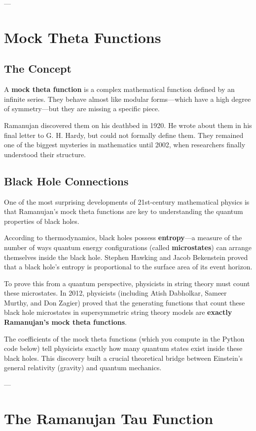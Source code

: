\documentclass[11pt]{article}
\begin{document}
---

\section{Mock Theta Functions}

\subsection{The Concept}
A \textbf{mock theta function} is a complex mathematical function defined by an infinite series. They behave almost like modular forms---which have a high degree of symmetry---but they are missing a specific piece.

Ramanujan discovered them on his deathbed in 1920. He wrote about them in his final letter to G. H. Hardy, but could not formally define them. They remained one of the biggest mysteries in mathematics until 2002, when researchers finally understood their structure.

\subsection{Black Hole Connections}
One of the most surprising developments of 21st-century mathematical physics is that Ramanujan's mock theta functions are key to understanding the quantum properties of black holes. 

According to thermodynamics, black holes possess \textbf{entropy}---a measure of the number of ways quantum energy configurations (called \textbf{microstates}) can arrange themselves inside the black hole. Stephen Hawking and Jacob Bekenstein proved that a black hole's entropy is proportional to the surface area of its event horizon. 

To prove this from a quantum perspective, physicists in string theory must count these microstates. In 2012, physicists (including Atish Dabholkar, Sameer Murthy, and Don Zagier) proved that the generating functions that count these black hole microstates in supersymmetric string theory models are \textbf{exactly Ramanujan's mock theta functions}. 

The coefficients of the mock theta functions (which you compute in the Python code below) tell physicists exactly how many quantum states exist inside these black holes. This discovery built a crucial theoretical bridge between Einstein's general relativity (gravity) and quantum mechanics.

---

\section{The Ramanujan Tau Function}
\end{document}
